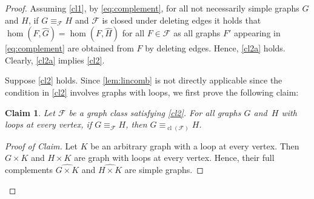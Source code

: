 \documentclass[3p,final]{elsarticle}
\DeclareMathOperator{\cl}{cl}
\newtheorem{claim}{Claim}[theorem]
\newenvironment{claimproof}[1][Proof of Claim]{\begin{proof}[#1] \renewcommand{\qedsymbol}{$\lrcorner$}}{ \end{proof}}
\begin{document}
	\begin{proof}%
		Assuming \ref{cl1}, by \cref{eq:complement}, for all not necessarily simple graphs $G$ and $H$, if $G \equiv_{\mathcal{F}} H$ and $\mathcal{F}$ is closed under deleting edges it holds that $\hom(F, \widehat{G}) = \hom(F, \widehat{H})$ for all $F \in \mathcal{F}$ as all graphs $F'$ appearing in \cref{eq:complement} are obtained from $F$ by deleting edges. 
		Hence, \ref{cl2a} holds.
		Clearly, \ref{cl2a} implies \ref{cl2}.
		
		Suppose \ref{cl2} holds.
		Since \cref{lem:lincomb} is not directly applicable since the condition in \ref{cl2} involves graphs with loops, we first prove the following claim:
		
		\begin{claim} \label{cl:full-complement}
			Let $\mathcal{F}$ be a graph class satisfying \ref{cl2}.
			For all graphs $G$ and~$H$ with loops at every vertex, %
			if $G \equiv_{\mathcal{F}} H$, then $G \equiv_{\cl(\mathcal{F})} H$.
		\end{claim}
		\begin{claimproof}
			Let $K$ be an arbitrary graph with a loop at every vertex. Then
			$G \times K$ and $H \times K$ are graph with loops at every vertex.
			Hence, their full complements $\widehat{G \times K}$ and $\widehat{H \times K}$ are simple graphs.
			

\end{claimproof}
\end{proof}
\end{document}
